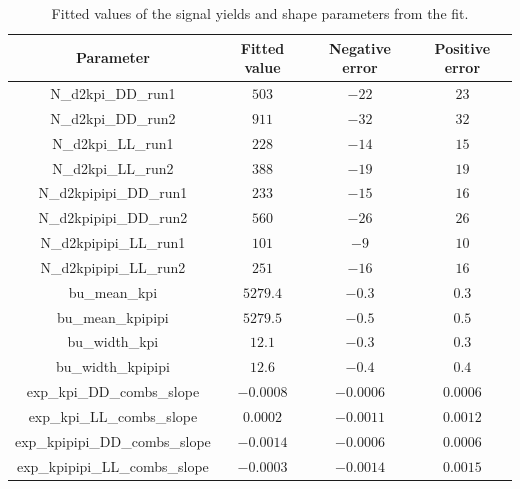 \begin{table}[h]
\centering
{\footnotesize
\begin{tabular}{cccc}
Parameter & Fitted value & Negative error & Positive error \\
\hline
N\_d2kpi\_DD\_run1 & $503$ & $-22$ & $23$ \\
N\_d2kpi\_DD\_run2 & $911$ & $-32$ & $32$ \\
N\_d2kpi\_LL\_run1 & $228$ & $-14$ & $15$ \\
N\_d2kpi\_LL\_run2 & $388$ & $-19$ & $19$ \\
N\_d2kpipipi\_DD\_run1 & $233$ & $-15$ & $16$ \\
N\_d2kpipipi\_DD\_run2 & $560$ & $-26$ & $26$ \\
N\_d2kpipipi\_LL\_run1 & $101$ & $-9$ & $10$ \\
N\_d2kpipipi\_LL\_run2 & $251$ & $-16$ & $16$ \\
bu\_mean\_kpi & $5279.4$ & $-0.3$ & $0.3$ \\
bu\_mean\_kpipipi & $5279.5$ & $-0.5$ & $0.5$ \\
bu\_width\_kpi & $12.1$ & $-0.3$ & $0.3$ \\
bu\_width\_kpipipi & $12.6$ & $-0.4$ & $0.4$ \\
exp\_kpi\_DD\_combs\_slope & $-0.0008$ & $-0.0006$ & $0.0006$ \\
exp\_kpi\_LL\_combs\_slope & $0.0002$ & $-0.0011$ & $0.0012$ \\
exp\_kpipipi\_DD\_combs\_slope & $-0.0014$ & $-0.0006$ & $0.0006$ \\
exp\_kpipipi\_LL\_combs\_slope & $-0.0003$ & $-0.0014$ & $0.0015$ \\
\end{tabular}}
\caption{Fitted values of the signal yields and shape parameters from the \CP fit.}
\label{cpfitresultsshapes}
\end{table}

